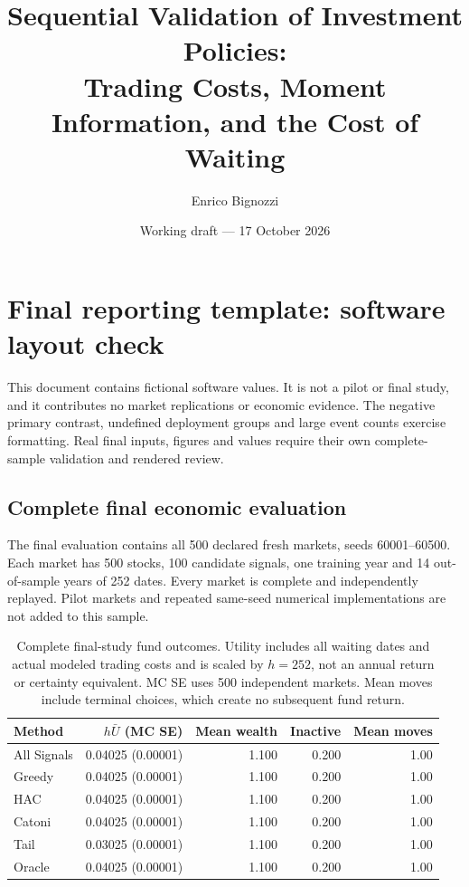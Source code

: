 \documentclass[11pt,a4paper]{article}
\title{Sequential Validation of Investment Policies:\\Trading Costs, Moment Information, and the Cost of Waiting}
\author{Enrico Bignozzi}
\date{Working draft --- 17 October 2026}
\theoremstyle{remark}\newtheorem{remark}[theorem]{Remark}
\begin{document}
\section*{Final reporting template: software layout check}
This document contains fictional software values. It is not a pilot or final
study, and it contributes no market replications or economic evidence.
The negative primary contrast, undefined deployment groups and large event
counts exercise formatting. Real final inputs, figures and values require
their own complete-sample validation and rendered review.

\subsection{Complete final economic evaluation}

The final evaluation contains all 500 declared fresh markets, seeds 60001--60500. Each market has 500 stocks, 100 candidate signals, one training year and 14 out-of-sample years of 252 dates. Every market is complete and independently replayed. Pilot markets and repeated same-seed numerical implementations are not added to this sample.

\begin{table}[H]\centering\small

\begin{tabular}{lrrrr}\toprule

Method & $h\bar U$ (MC SE) & Mean wealth & Inactive & Mean moves \\\midrule

All Signals & 0.04025 (0.00001) & 1.100 & 0.200 & 1.00 \\

Greedy & 0.04025 (0.00001) & 1.100 & 0.200 & 1.00 \\

HAC & 0.04025 (0.00001) & 1.100 & 0.200 & 1.00 \\

Catoni & 0.04025 (0.00001) & 1.100 & 0.200 & 1.00 \\

Tail & 0.03025 (0.00001) & 1.100 & 0.200 & 1.00 \\

Oracle & 0.04025 (0.00001) & 1.100 & 0.200 & 1.00 \\

\bottomrule\end{tabular}

\caption{Complete final-study fund outcomes. Utility includes all waiting dates and actual modeled trading costs and is scaled by $h=252$, not an annual return or certainty equivalent. MC SE uses 500 independent markets. Mean moves include terminal choices, which create no subsequent fund return.}\label{tab:final-funds}\end{table}
\end{document}
